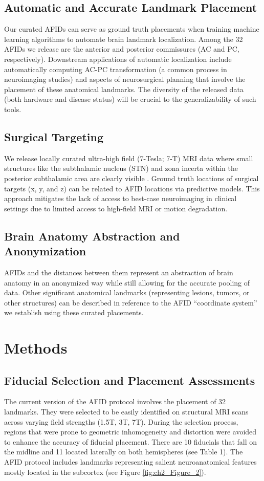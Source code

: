 \subsection{Automatic and Accurate Landmark Placement}
Our curated AFIDs can serve as ground truth placements when training machine learning algorithms to automate brain landmark localization. Among the 32 AFIDs we release are the anterior and posterior commissures (AC and PC, respectively). Downstream applications of automatic localization include automatically computing AC-PC transformation (a common process in neuroimaging studies) and aspects of neurosurgical planning that involve the placement of these anatomical landmarks. The diversity of the released data (both hardware and disease status) will be crucial to the generalizability of such tools.

\subsection{Surgical Targeting}
We release locally curated ultra-high field (7-Tesla; 7-T) MRI data where small structures like the subthalamic nucleus (STN) and zona incerta within the posterior subthalamic area are clearly visible \cite{Keuken2013-ax, Lau2020-dh}. Ground truth locations of surgical targets (x, y, and z) can be related to AFID locations via predictive models. This approach mitigates the lack of access to best-case neuroimaging in clinical settings due to limited access to high-field MRI or motion degradation.

\subsection{Brain Anatomy Abstraction and Anonymization}
AFIDs and the distances between them represent an abstraction of brain anatomy in an anonymized way while still allowing for the accurate pooling of data. Other significant anatomical landmarks (representing lesions, tumors, or other structures) can be described in reference to the AFID “coordinate system” we establish using these curated placements.

\section{Methods}
\subsection{Fiducial Selection and Placement Assessments}
The current version of the AFID protocol involves the placement of 32 landmarks. They were selected to be easily identified on structural MRI scans across varying field strengths (1.5T, 3T, 7T). During the selection process, regions that were prone to geometric inhomogeneity and distortion were avoided to enhance the accuracy of fiducial placement. There are 10 fiducials that fall on the midline and 11 located laterally on both hemispheres (see Table 1). The AFID protocol includes landmarks representing salient neuroanatomical features mostly located in the subcortex (see Figure \ref{fig:ch2_Figure_2}).

